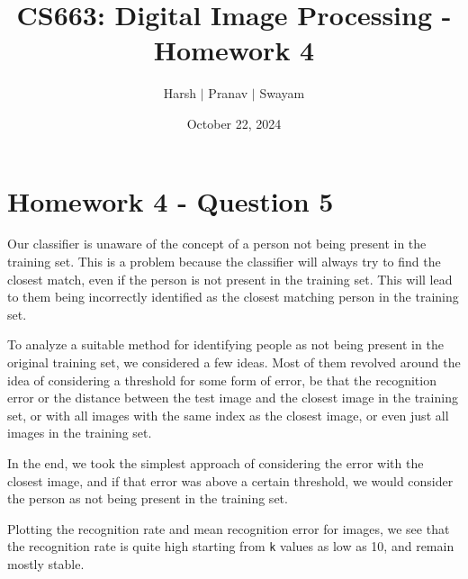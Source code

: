 \documentclass{article}
\title{CS663: Digital Image Processing - Homework 4}
\author{Harsh $\vert$ Pranav $\vert$ Swayam}
\date{October 22, 2024}
\begin{document}
\maketitle
\section{Homework 4 - Question 5}

Our classifier is unaware of the concept of a person not being present in the training set. This is a problem because the classifier will always try to find the closest match, even if the person is not present in the training set. This will lead to them being incorrectly identified as the closest matching person in the training set.
\vspace{5pt}

To analyze a suitable method for identifying people as not being present in the original training set, we considered a few ideas. Most of them revolved around the idea of considering a threshold for some form of error, be that the recognition error or the distance between the test image and the closest image in the training set, or with all images with the same index as the closest image, or even just all images in the training set. 
\vspace{5pt}

In the end, we took the simplest approach of considering the error with the closest image, and if that error was above a certain threshold, we would consider the person as not being present in the training set.

Plotting the recognition rate and mean recognition error for images, we see that the recognition rate is quite high starting from \texttt{k} values as low as 10, and remain mostly stable. 
\end{document}
